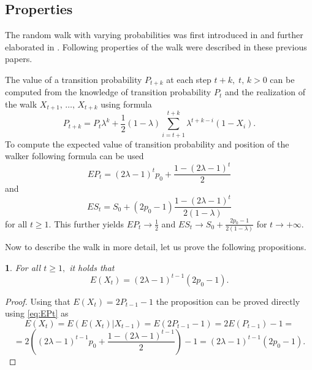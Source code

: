 \documentclass{amsart}
\theoremstyle{definition}
\theoremstyle{plain}
\newtheorem{prop}[thm]{\protect\propositionname}
\theoremstyle{plain}
\theoremstyle{plain}
\numberwithin{equation}{section}
\providecommand{\propositionname}{Proposition}
\begin{document}
    \subsection{Properties}

    The random walk with varying probabilities was first introduced in
    \cite{ja2017ddny} and further elaborated in \cite{ja2019teze}.
    Following properties of the walk were described in these previous
    papers.

    The value of a transition probability $P_{t+k}$ at
    each step $t+k,\;t,\,k>0$ can be computed from the knowledge of
    transition probability $P_{t}$ and the realization of the walk
    $X_{t+1},\,\dots,\,X_{t+k}$ using formula
    \begin{equation}
        P_{t+k}=P_{t}\lambda^{k}+\frac{1}{2}(1-\lambda)\sum_{i=t+1}^{t+k}\lambda^{t+k-i}(1-X_{i}).\label{eq:Pt}
    \end{equation}
    To compute the expected value of transition probability and position of the walker following formula can be used
    \begin{equation}
        EP_{t}=(2\lambda-1)^{t}p_{0}+\frac{1-(2\lambda-1)^{t}}{2}\label{eq:EPt}
    \end{equation}
    and
    \begin{equation}
        ES_{t}=S_{0}+(2p_{0}-1)\frac{1-(2\lambda-1)^{t}}{2(1-\lambda)}\label{eq:ESt}
    \end{equation}
    for all $t\geq1$. This further yields $EP_{t}\rightarrow\frac{1}{2}$
    and $ES_{t}\rightarrow S_{0}+\frac{2p_{0}-1}{2(1-\lambda)}$ for $t\rightarrow+\infty$.

    Now to describe the walk in more detail, let us
    prove the following propositions.

    \begin{prop}
        \label{PropEXt-succes}
        For all $t\geq1,$ it holds that
        \begin{equation}
            E(X_{t})=(2\lambda-1)^{t-1}(2p_{0}-1).
        \end{equation}
    \end{prop}
    \begin{proof}
        Using that $E(X_{t})=2P_{t-1}-1$ the proposition can be
        proved directly using \eqref{eq:EPt} as
        \[
            E(X_{t})=E(E(X_{t})|X_{t-1})=E(2P_{t-1}-1)=2E(P_{t-1})-1=
        \]
        \[
            =2((2\lambda-1)^{t-1}p_{0}+\frac{1-(2\lambda-1)^{t-1}}{2})-1=(2\lambda-1)^{t-1}(2p_{0}-1).
        \]
    \end{proof}
\end{document}
